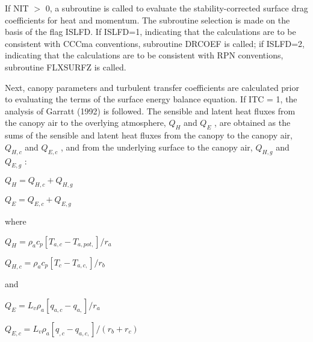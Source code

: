 If N\+I\+T $>$ 0, a subroutine is called to evaluate the stability-\/corrected surface drag coefficients for heat and momentum. The subroutine selection is made on the basis of the flag I\+S\+L\+F\+D. If I\+S\+L\+F\+D=1, indicating that the calculations are to be consistent with C\+C\+Cma conventions, subroutine D\+R\+C\+O\+E\+F is called; if I\+S\+L\+F\+D=2, indicating that the calculations are to be consistent with R\+P\+N conventions, subroutine F\+L\+X\+S\+U\+R\+F\+Z is called.

Next, canopy parameters and turbulent transfer coefficients are calculated prior to evaluating the terms of the surface energy balance equation. If I\+T\+C = 1, the analysis of Garratt (1992) \cite{Garratt1992-dt} is followed. The sensible and latent heat fluxes from the canopy air to the overlying atmosphere, $Q_H$ and $Q_E$ , are obtained as the sums of the sensible and latent heat fluxes from the canopy to the canopy air, $Q_{H,c}$ and $Q_{E,c}$ , and from the underlying surface to the canopy air, $Q_{H,g}$ and $Q_{E,g}$ \+:

$Q_H = Q_{H,c} + Q_{H,g}$

$Q_E = Q_{E,c} + Q_{E,g}$

where

$Q_H = \rho_a c_p [T_{a,c} - T_{a,pot,} ]/r_a$

$Q_{H,c} = \rho_a c_p [T_c - T_{a,c,} ]/r_b$

and

$Q_E = L_v \rho_a [q_{a,c} - q_{a,} ]/r_a$

$Q_{E,c} = L_v \rho_a [q_{,c} - q_{a,c,} ]/(r_b + r_c )$

